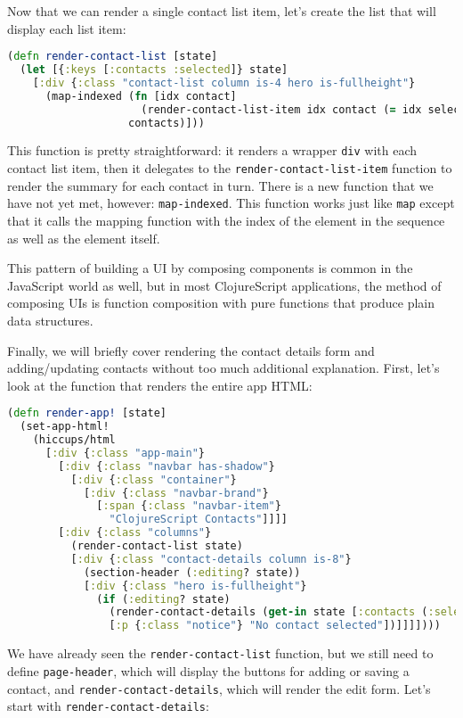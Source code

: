 \documentclass[10pt,twoside,openright]{memoir}
\begin{document}
Now that we can render a single contact list item, let's create the list
that will display each list item:

\begin{lstlisting}[language=Clojure]
(defn render-contact-list [state]
  (let [{:keys [:contacts :selected]} state]
    [:div {:class "contact-list column is-4 hero is-fullheight"}
      (map-indexed (fn [idx contact]
                     (render-contact-list-item idx contact (= idx selected)))
                   contacts)]))
\end{lstlisting}

This function is pretty straightforward: it renders a wrapper
\texttt{div} with each contact list item, then it delegates to the
\texttt{render-contact-list-item} function to render the summary for
each contact in turn. There is a new function that we have not yet met,
however: \texttt{map-indexed}. This function works just like
\texttt{map} except that it calls the mapping function with the index of
the element in the sequence as well as the element itself.

This pattern of building a UI by composing components is common in the
JavaScript world as well, but in most ClojureScript applications, the
method of composing UIs is function composition with pure functions that
produce plain data structures.

Finally, we will briefly cover rendering the contact details form and
adding/updating contacts without too much additional explanation. First,
let's look at the function that renders the entire app HTML:

\begin{lstlisting}[language=Clojure]
(defn render-app! [state]
  (set-app-html!
    (hiccups/html
      [:div {:class "app-main"}
        [:div {:class "navbar has-shadow"}
          [:div {:class "container"}
            [:div {:class "navbar-brand"}
              [:span {:class "navbar-item"}
                "ClojureScript Contacts"]]]]
        [:div {:class "columns"}
          (render-contact-list state)
          [:div {:class "contact-details column is-8"}
            (section-header (:editing? state))
            [:div {:class "hero is-fullheight"}
              (if (:editing? state)
                (render-contact-details (get-in state [:contacts (:selected state)] {}))
                [:p {:class "notice"} "No contact selected"])]]]])))
\end{lstlisting}

We have already seen the \texttt{render-contact-list} function, but we
still need to define \texttt{page-header}, which will display the
buttons for adding or saving a contact, and
\texttt{render-contact-details}, which will render the edit form. Let's
start with \texttt{render-contact-details}:
\end{document}
